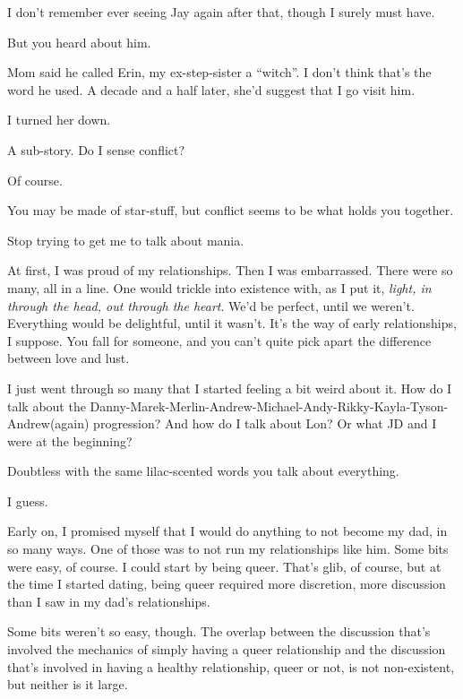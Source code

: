 \begin{leftcolumn}

I don't remember ever seeing Jay again after that, though I surely must have.

\begin{ally}
But you heard about him.
\end{ally}
Mom said he called Erin, my ex-step-sister a ``witch''. I don't think that's the word he used. A decade and a half later, she'd suggest that I go visit him.

I turned her down.

\begin{ally}
A sub-story. Do I sense conflict?
\end{ally}
Of course.

\begin{ally}
You may be made of star-stuff, but conflict seems to be what holds you together.
\end{ally}
Stop trying to get me to talk about mania.

At first, I was proud of my relationships. Then I was embarrassed. There were so many, all in a line. One would trickle into existence with, as I put it, \emph{light, in through the head, out through the heart}. We'd be perfect, until we weren't. Everything would be delightful, until it wasn't. It's the way of early relationships, I suppose. You fall for someone, and you can't quite pick apart the difference between love and lust.

I just went through so many that I started feeling a bit weird about it. How do I talk about the Danny-Marek-Merlin-Andrew-Michael-Andy-Rikky-Kayla-Tyson-Andrew(again) progression? And how do I talk about Lon? Or what JD and I were at the beginning?

\begin{ally}
Doubtless with the same lilac-scented words you talk about everything.
\end{ally}
I guess.

Early on, I promised myself that I would do anything to not become my dad, in so many ways. One of those was to not run my relationships like him. Some bits were easy, of course. I could start by being queer. That's glib, of course, but at the time I started dating, being queer required more discretion, more discussion than I saw in my dad's relationships.

Some bits weren't so easy, though. The overlap between the discussion that's involved the mechanics of simply having a queer relationship and the discussion that's involved in having a healthy relationship, queer or not, is not non-existent, but neither is it large.


\end{leftcolumn}
